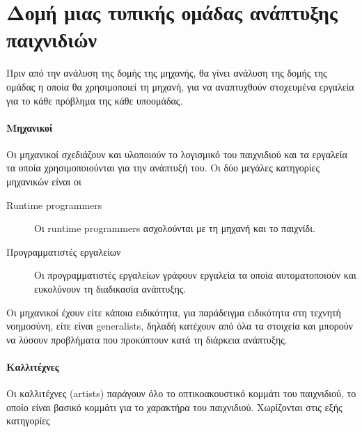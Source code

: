 \section{Δομή μιας τυπικής ομάδας ανάπτυξης παιχνιδιών}
	Πριν από την ανάλυση της δομής της μηχανής, θα γίνει ανάλυση της δομής της ομάδας η οποία θα χρησιμοποιεί τη μηχανή, για να αναπτυχθούν στοχευμένα εργαλεία για το κάθε πρόβλημα της κάθε υποομάδας.
	
	\paragraph{Μηχανικοί}	
	Οι μηχανικοί σχεδιάζουν και υλοποιούν το λογισμικό του παιχνιδιού και τα εργαλεία τα οποία χρησιμοποιούνται για την ανάπτυξή του. Οι δύο μεγάλες κατηγορίες μηχανικών είναι οι
	\begin{description}
		\item [Runtime programmers] Οι runtime programmers ασχολούνται με τη μηχανή και το παιχνίδι.
		\item [Προγραμματιστές εργαλείων] Οι προγραμματιστές εργαλείων γράφουν εργαλεία τα οποία αυτοματοποιούν και ευκολύνουν τη διαδικασία ανάπτυξης.
	\end{description}
	Οι μηχανικοί έχουν είτε κάποια ειδικότητα, για παράδειγμα ειδικότητα στη τεχνητή νοημοσύνη, είτε είναι generalists, δηλαδή κατέχουν από όλα τα στοιχεία και μπορούν να λύσουν προβλήματα που προκύπτουν κατά τη διάρκεια ανάπτυξης.
	
	\paragraph{Καλλιτέχνες}
	Οι καλλιτέχνες (artists) παράγουν όλο το οπτικοακουστικό κομμάτι του παιχνιδιού, το οποίο είναι βασικό κομμάτι για το χαρακτήρα του παιχνιδιού. Χωρίζονται στις εξής κατηγορίες
	

